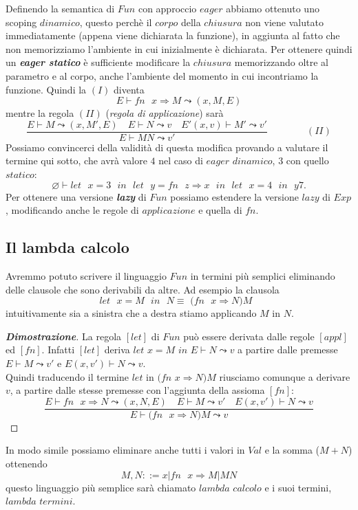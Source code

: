 \documentclass{article}
\theoremstyle{definition}
\theoremstyle{definition}
\theoremstyle{definition}
\theoremstyle{remark}
\begin{document}
    Definendo la semantica di $Fun$ con approccio $eager$ abbiamo ottenuto uno scoping $dinamico$, questo perchè  il $corpo$ della $chiusura$ non viene valutato immediatamente (appena viene dichiarata la funzione), in aggiunta
    al fatto che non memorizziamo l'ambiente in cui inizialmente è dichiarata. Per ottenere quindi un \textbf{\textit{eager statico}} è sufficiente modificare la $chiusura$ memorizzando oltre al parametro e al corpo, anche l'ambiente
    del momento in cui incontriamo la funzione.
    Quindi la $(I)$ diventa
    $$E\vdash\text{$fn$ $x\Rightarrow M$}\leadsto(x,M,E)$$
    mentre la regola $(II)$ (\textit{regola di applicazione}) sarà
    $$\frac{E\vdash M \leadsto (x,M',E) \quad E \vdash N\leadsto v \quad E'(x,v)\vdash M'\leadsto v'}{E\vdash MN\leadsto v'}\qquad \qquad (II)$$
    Possiamo convincerci della validità di questa modifica provando a valutare il termine qui sotto, che avrà valore $4$ nel caso di $eager$ $dinamico$, $3$ con quello $statico$:
    $$\varnothing\vdash \text{$let$ $x=3$ $in$ $let$ $y=fn$ $z\Rightarrow x$ $in$ $let$ $x=4$ $in$ $y7$.}$$
    Per ottenere una versione \textbf{\textit{lazy}} di $Fun$ possiamo estendere la versione $lazy$ di $Exp$, modificando anche le regole di $applicazione$ e quella di $fn$.
    \subsection{Il lambda calcolo}
    Avremmo potuto scrivere il linguaggio $Fun$ in termini più semplici eliminando delle clausole che sono derivabili da altre. Ad esempio la clausola
    $$\text{$let$ $x=M$ $in$ $N \equiv$ ($fn$ $x\Rightarrow N)M$  }$$
    intuitivamente sia a sinistra che a destra stiamo applicando $M$ in $N$.
    \begin{proof}[\textbf{Dimostrazione}]
        La regola $[let]$ di $Fun$ può essere derivata dalle regole  $[appl]$ ed $[fn]$. Infatti $[let]$ deriva $let$ $x=M$ $in$ $E\vdash N\leadsto v$ a partire dalle premesse
        $E\vdash M\leadsto v'$  e $E(x,v')\vdash N \leadsto v$. \\Quindi  traducendo il termine $let$ in  $(fn$ $x\Rightarrow N)M$ riusciamo comunque a derivare $v$, a partire dalle stesse premesse  con l'aggiunta della assioma $[fn]$:
        $$\frac{E\vdash \text{$fn$ $x\Rightarrow N\leadsto (x,N,E)$}\quad E\vdash M\leadsto v' \quad E(x,v')\vdash N \leadsto v  }{E\vdash \text{$(fn$ $x\Rightarrow N)M\leadsto v$}}$$
    \end{proof}
    In modo simile possiamo eliminare anche tutti i valori in $Val$ e la somma ($M+N$) ottenendo
    $$M,N ::= x|\text{$fn$ $x\Rightarrow M|MN$}$$
    questo linguaggio più semplice  sarà chiamato $lambda$ $calcolo$ e i suoi termini, $lambda$ $termini$.
\end{document}

